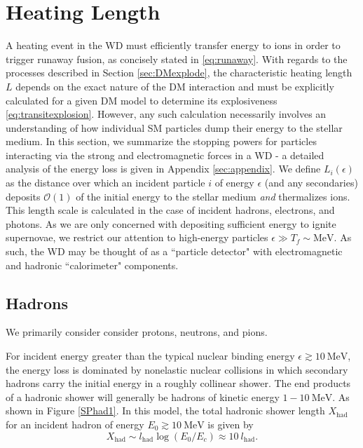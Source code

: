 \documentclass[twocolumn,showpacs,preprintnumbers,amsmath,amssymb,prd]{revtex4}
\newcommand{\OO}{\mathcal{O}}
\begin{document}
\section{Heating Length}
\label{sec:HeatingLength}
A heating event in the WD must efficiently transfer energy to ions in order to trigger runaway fusion, as concisely stated in \eqref{eq:runaway}. With regards to the processes described in Section \ref{sec:DMexplode}, the characteristic heating length $L$ depends on the exact nature of the DM interaction and must be explicitly calculated for a given DM model to determine its explosiveness \eqref{eq:transitexplosion}. However, any such calculation necessarily involves an understanding of how individual SM particles dump their energy to the stellar medium. In this section, we summarize the stopping powers for particles interacting via the strong and electromagnetic forces in a WD - a detailed analysis of the energy loss is given in Appendix \ref{sec:appendix}. We define $L_i(\epsilon)$ as the distance over which an incident particle $i$ of energy $\epsilon$ (and any secondaries) deposits $\OO(1)$ of the initial energy to the stellar medium \emph{and} thermalizes ions. This length scale is calculated in the case of incident hadrons, electrons, and photons. As we are only concerned with depositing sufficient energy to ignite supernovae, we restrict our attention to high-energy particles $\epsilon \gg T_f \sim \text{MeV}$. As such, the WD may be thought of as a ``particle detector" with electromagnetic and hadronic ``calorimeter" components.

\subsection{Hadrons}
We primarily consider consider protons, neutrons, and pions.

For incident energy greater than the typical nuclear binding energy $\epsilon \gtrsim 10 ~\text{MeV}$, the energy loss is dominated by nonelastic nuclear collisions in which secondary hadrons carry the initial energy in a roughly collinear shower. The end products of a hadronic shower will generally be hadrons of kinetic energy $1-10 ~\text{MeV}$. As shown in Figure \ref{SPhad1}. In this model, the total hadronic shower length $X_{\text{had}}$ for an incident hadron of energy $E_0 \gtrsim 10 ~\text{MeV}$ is given by
\begin{equation}
X_{\text{had}} \sim l_\text{had} \log{(E_0/E_c)} \approx 10 ~l_\text{had}.
\end{equation}
\end{document}
